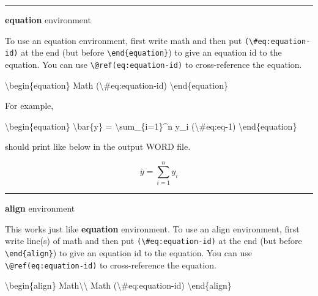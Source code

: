 \documentclass[
  letterpaper,
  DIV=11,
  numbers=noendperiod]{scrreprt}
\newenvironment{Shaded}{\begin{snugshade}}{\end{snugshade}}
\newcommand{\NormalTok}[1]{\textcolor[rgb]{0.00,0.23,0.31}{#1}}
\newcommand{\SpecialCharTok}[1]{\textcolor[rgb]{0.37,0.37,0.37}{#1}}
\begin{document}
\begin{center}\rule{0.5\linewidth}{0.5pt}\end{center}

\textbf{equation} environment

To use an equation environment, first write math and then put
\texttt{(\textbackslash{}\#eq:equation-id)} at the end (but before
\texttt{\textbackslash{}end\{equation\}}) to give an equation id to the
equation. You can use \texttt{\textbackslash{}@ref(eq:equation-id)} to
cross-reference the equation.

\begin{Shaded}
\begin{Highlighting}[]
\NormalTok{\textbackslash{}begin\{equation\}}
\NormalTok{Math}
\NormalTok{(}\SpecialCharTok{\textbackslash{}\#}\NormalTok{eq:equation{-}id)}
\NormalTok{\textbackslash{}end\{equation\}}
\end{Highlighting}
\end{Shaded}

For example,

\begin{Shaded}
\begin{Highlighting}[]
\NormalTok{\textbackslash{}begin\{equation\}}
\NormalTok{\textbackslash{}bar\{y\} = \textbackslash{}sum\_\{i=1\}\^{}n y\_i}
\NormalTok{(}\SpecialCharTok{\textbackslash{}\#}\NormalTok{eq:eq{-}1)}
\NormalTok{\textbackslash{}end\{equation\}}
\end{Highlighting}
\end{Shaded}

should print like below in the output WORD file.

\[
\begin{equation}
\bar{y} = \sum_{i=1}^n y_i
\end{equation}
\]

\begin{center}\rule{0.5\linewidth}{0.5pt}\end{center}

\textbf{align} environment

This works just like \textbf{equation} environment. To use an align
environment, first write line(s) of math and then put
\texttt{(\textbackslash{}\#eq:equation-id)} at the end (but before
\texttt{\textbackslash{}end\{align\}}) to give an equation id to the
equation. You can use \texttt{\textbackslash{}@ref(eq:equation-id)} to
cross-reference the equation.

\begin{Shaded}
\begin{Highlighting}[]
\NormalTok{\textbackslash{}begin\{align\}}
\NormalTok{Math}\SpecialCharTok{\textbackslash{}\textbackslash{}} 
\NormalTok{Math}
\NormalTok{(}\SpecialCharTok{\textbackslash{}\#}\NormalTok{eq:equation{-}id)}
\NormalTok{\textbackslash{}end\{align\}}
\end{Highlighting}
\end{Shaded}
\end{document}
